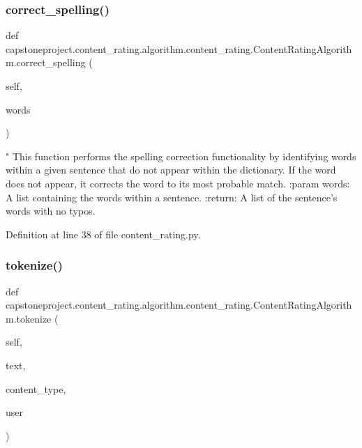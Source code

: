 \subsubsection{\texorpdfstring{correct\+\_\+spelling()}{correct\_spelling()}}
{\footnotesize\ttfamily def capstoneproject.\+content\+\_\+rating.\+algorithm.\+content\+\_\+rating.\+Content\+Rating\+Algorithm.\+correct\+\_\+spelling (\begin{DoxyParamCaption}\item[{}]{self,  }\item[{}]{words }\end{DoxyParamCaption})}

\begin{DoxyVerb}"
This function performs the spelling correction functionality by identifying words within a given sentence that
do not appear within the dictionary. If the word does not appear, it corrects the word to its most probable
match.
:param words: A list containing the words within a sentence.
:return: A list of the sentence's words with no typos.
\end{DoxyVerb}
 

Definition at line 38 of file content\+\_\+rating.\+py.

\mbox{\label{classcapstoneproject_1_1content__rating_1_1algorithm_1_1content__rating_1_1_content_rating_algorithm_aa1231998b1d540c0ea6979ccb241ac4f}} 
\subsubsection{\texorpdfstring{tokenize()}{tokenize()}}
{\footnotesize\ttfamily def capstoneproject.\+content\+\_\+rating.\+algorithm.\+content\+\_\+rating.\+Content\+Rating\+Algorithm.\+tokenize (\begin{DoxyParamCaption}\item[{}]{self,  }\item[{}]{text,  }\item[{}]{content\+\_\+type,  }\item[{}]{user }\end{DoxyParamCaption})}

